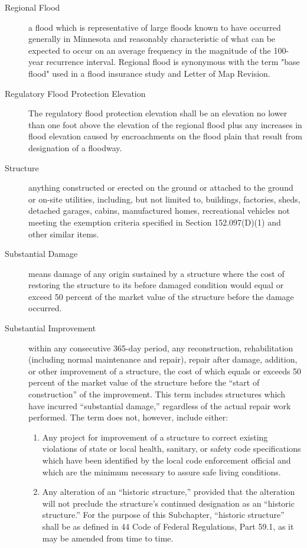 \begin{description}
    \item[Regional Flood] a flood which is representative of large floods known to have occurred generally in Minnesota and reasonably characteristic of what can be expected to occur on an average frequency in the magnitude of the 100-year recurrence interval. Regional flood is synonymous with the term "base flood" used in a flood insurance study and Letter of Map Revision.
    \item[Regulatory Flood Protection Elevation] The regulatory flood protection elevation shall be an elevation no lower than one foot above the elevation of the regional flood plus any increases in flood elevation caused by encroachments on the flood plain that result from designation of a floodway.
    \item[Structure] anything constructed or erected on the ground or attached to the ground or on-site utilities, including, but not limited to, buildings, factories, sheds, detached garages, cabins, manufactured homes, recreational vehicles not meeting the exemption criteria specified in Section 152.097(D)(1) and other similar items.
    \item[Substantial Damage] means damage of any origin sustained by a structure where the cost of restoring the structure to its before damaged condition would equal or exceed 50 percent of the market value of the structure before the damage occurred.
    \item[Substantial Improvement] within any consecutive 365-day period, any reconstruction, rehabilitation (including normal maintenance and repair), repair after damage, addition, or other improvement of a structure, the cost of which equals or exceeds 50 percent of the market value of the structure before the “start of construction” of the improvement. This term includes structures which have incurred “substantial damage,” regardless of the actual repair work performed. The term does not, however, include either:
        \begin{enumerate}[{\indent}a)]
            \item Any project for improvement of a structure to correct existing violations of state or local health, sanitary, or safety code specifications which have been identified by the local code enforcement official and which are the minimum necessary to assure safe living conditions.
            \item Any alteration of an “historic structure,” provided that the alteration will not preclude the structure's continued designation as an “historic structure.” For the purpose of this Subchapter, “historic structure” shall be as defined in 44 Code of Federal Regulations, Part 59.1, as it may be amended from time to time.

\end{enumerate}
\end{description}
